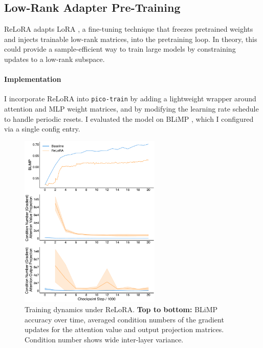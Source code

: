 \subsection{Low-Rank Adapter Pre-Training}
\label{subsec:pico-low-rank-adapter}

ReLoRA \citep{lialin2023relora} adapts LoRA \citep{hu2021lora}, a fine-tuning technique that freezes pretrained weights and injects trainable low-rank matrices, into the pretraining loop. In theory, this could provide a sample-efficient way to train large models by constraining updates to a low-rank subspace. %

\paragraph{Implementation} I incorporate ReLoRA into \texttt{pico-train} by adding a lightweight wrapper around attention and MLP weight matrices, and by modifying the learning rate schedule to handle periodic resets. I evaluated the model on BLiMP \citep{warstadt2020blimp}, which I configured via a single config entry. %

\begin{figure}[h!]
    \centering
    \includegraphics[width=0.6\textwidth]{chapters/pico/figures/relora-example.pdf}
    \caption{Training dynamics under ReLoRA.
    \textbf{Top to bottom:} BLiMP accuracy over time, averaged condition numbers of the gradient updates for the attention value and output projection matrices. Condition number shows wide inter-layer variance.
    }
    \label{fig:relora_example}
\end{figure}

